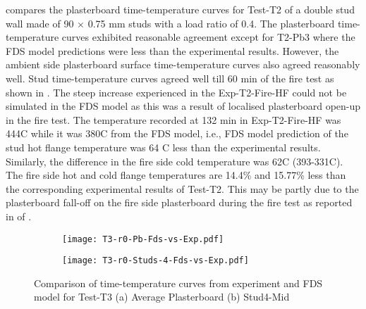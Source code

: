  compares the plasterboard time-temperature curves for Test-T2 of a double stud wall made of 90 $\times$ 0.75 mm studs with a load ratio of 0.4. The plasterboard time-temperature curves exhibited reasonable agreement except for T2-Pb3 where the FDS model predictions were less than the experimental results. However, the ambient side plasterboard surface time-temperature curves also agreed reasonably well. Stud time-temperature curves agreed well till 60 min of the fire test as shown in . The steep increase experienced in the Exp-T2-Fire-HF could not be simulated in the FDS model as this was a result of localised plasterboard open-up in the fire test. The temperature recorded at 132 min in Exp-T2-Fire-HF was 444\degree C while it was 380\degree C from the FDS model, i.e., FDS model prediction of the stud hot flange temperature was 64 \degree C less than the experimental results. Similarly, the difference in the fire side cold temperature was 62\degree C (393-331\degree C). The fire side hot and cold flange temperatures are 14.4\% and 15.77\% less than the corresponding experimental results of Test-T2. This may be partly due to the plasterboard fall-off on the fire side plasterboard during the fire test as reported in  of .
\begin{figure}[!htbp]
	\centering
	\begin{subfigure}[b]{0.7\textwidth}
		\centering
		\texttt{[image: T3-r0-Pb-Fds-vs-Exp.pdf]}
		\caption{}
		\label{subfig:T3-r0-Pb-Fds-vs-Exp}
	\end{subfigure}
	\begin{subfigure}[b]{0.6\textwidth}
		\centering
		\texttt{[image: T3-r0-Studs-4-Fds-vs-Exp.pdf]}
		\caption{}
		\label{subfig:T3-r0-Studs-4-Fds-vs-Exp}
	\end{subfigure}
	   \caption{Comparison of time-temperature curves from experiment and FDS model for Test-T3 (a) Average Plasterboard (b) Stud4-Mid}
	   \label{fig:fds-output-pb-studs-t3}
\end{figure}

